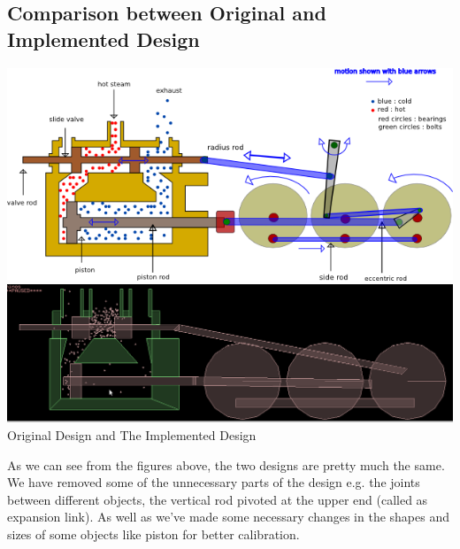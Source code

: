 \documentclass[11pt]{article}
\begin{document}
\subsection{Comparison between Original and Implemented Design}
\begin{center}
  \includegraphics[width=\textwidth,height=\textheight,keepaspectratio]{loco.png}
  \includegraphics[width=\textwidth,height=\textheight,keepaspectratio]{working.png}
  Original Design and The Implemented Design
\end{center}
As we can see from the figures above, the two designs are pretty much the same. We have removed some of the unnecessary parts of the design e.g. the joints between different objects, the vertical rod pivoted at the upper end (called as expansion link). As well as we've made some necessary changes in the shapes and sizes of some objects like piston for better calibration.
\end{document}
